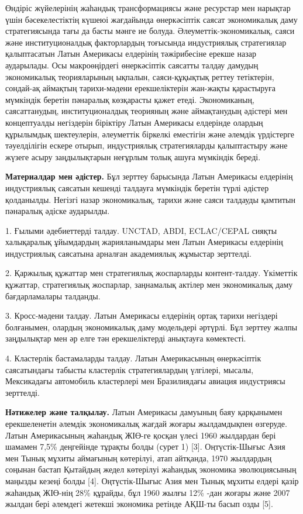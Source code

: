 \begin{multicols}{2}
Өндіріс жүйелерінің жаһандық трансформациясы және ресурстар мен нарықтар
үшін бәсекелестіктің күшеюі жағдайында өнеркәсіптік саясат экономикалық
даму стратегиясында тағы да басты мәнге ие болуда.
Әлеуметтік-экономикалық, саяси және институционалдық факторлардың
тоғысында индустриялық стратегиялар қалыптасатын Латын Америкасы
елдерінің тәжірибесіне ерекше назар аударылады. Осы макроөңірдегі
өнеркәсіптік саясатты талдау дамудың экономикалық теорияларының ықпалын,
саяси-құқықтық реттеу тетіктерін, сондай-ақ аймақтың тарихи-мәдени
ерекшеліктерін жан-жақты қарастыруға мүмкіндік беретін пәнаралық
көзқарасты қажет етеді. Экономиканың, саясаттанудың, институционалдық
теорияның және аймақтанудың әдістері мен концептуалды негіздерін
біріктіру Латын Америкасы елдерінде олардың құрылымдық шектеулерін,
әлеуметтік біркелкі еместігін және әлемдік үрдістерге тәуелділігін
ескере отырып, индустриялық стратегияларды қалыптастыру және жүзеге
асыру заңдылықтарын неғұрлым толық ашуға мүмкіндік береді.

{\bfseries Материалдар мен әдістер.} Бұл зерттеу барысында Латын Америкасы
елдерінің индустриялық саясатын кешенді талдауға мүмкіндік беретін түрлі
әдістер қолданылды. Негізгі назар экономикалық, тарихи және саяси
талдауды қамтитын пәнаралық әдіске аударылды.

1. Ғылыми әдебиеттерді талдау. UNCTAD, ABDI, ECLAC/CEPAL сияқты
халықаралық ұйымдардың жарияланымдары мен Латын Америкасы елдерінің
индустриялық саясатына арналған академиялық жұмыстар зерттелді.

2. Қаржылық құжаттар мен стратегиялық жоспарларды контент-талдау.
Үкіметтік құжаттар, стратегиялық жоспарлар, заңнамалық актілер мен
экономикалық даму бағдарламалары талданды.

3. Кросс-мәдени талдау. Латын Америкасы елдерінің ортақ тарихи негіздері
болғанымен, олардың экономикалық даму модельдері әртүрлі. Бұл зерттеу
жалпы заңдылықтар мен әр елге тән ерекшеліктерді анықтауға көмектесті.

4. Кластерлік бастамаларды талдау. Латын Америкасының өнеркәсіптік
саясатындағы табысты кластерлік стратегиялардың үлгілері, мысалы,
Мексикадағы автомобиль кластерлері мен Бразилиядағы авиация
индустриясы зерттелді.

{\bfseries Нәтижелер және талқылау.} Латын Америкасы дамуының баяу
қарқынымен ерекшеленетін әлемдік экономикалық жағдай жоғары жылдамдықпен
өзгеруде. Латын Америкасының жаһандық ЖІӨ-ге қосқан үлесі 1960 жылдардан
бері шамамен 7,5\% деңгейінде тұрақты болды (сурет 1) {[}3{]}.
Оңтүстік-Шығыс Азия мен Тынық мұхиты аймағының көтерілуі, атап айтқанда,
1970 жылдардың соңынан бастап Қытайдың жедел көтерілуі жаһандық
экономика эволюциясының маңызды кезеңі болды {[}4{]}. Оңтүстік-Шығыс
Азия мен Тынық мұхиты елдері қазір жаһандық ЖІӨ-нің 28\% құрайды, бұл
1960 жылғы 12\% -дан жоғары және 2007 жылдан бері әлемдегі жетекші
экономика ретінде АҚШ-ты басып озды {[}5{]}.


\end{multicols}
